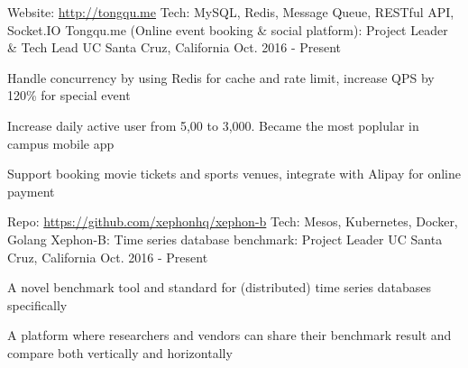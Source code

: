 

\begin{cventries}

  \cventry
    {Website: \url{http://tongqu.me} Tech: MySQL, Redis, Message Queue, RESTful API, Socket.IO} %
    {Tongqu.me (Online event booking \& social platform): Project Leader \& Tech Lead} %
    {UC Santa Cruz, California} %
    {Oct. 2016 - Present} %
    {
      \begin{cvitems} %
        \item {Handle concurrency by using Redis for cache and rate limit, increase QPS by 120\% for special event}
        \item {Increase daily active user from 5,00 to 3,000. Became the most poplular in campus mobile app}
        \item {Support booking movie tickets and sports venues, integrate with Alipay for online payment}
      \end{cvitems}
    }

  \cventry
    {Repo: \url{https://github.com/xephonhq/xephon-b} Tech: Mesos, Kubernetes, Docker, Golang } %
    {Xephon-B: Time series database benchmark: Project Leader} %
    {UC Santa Cruz, California} %
    {Oct. 2016 - Present} %
    {
      \begin{cvitems} %
        \item {A novel benchmark tool and standard for (distributed) time series databases specifically}
        \item {A platform where researchers and vendors can share their benchmark result and compare both vertically and horizontally}
      \end{cvitems}
    }


\end{cventries}
